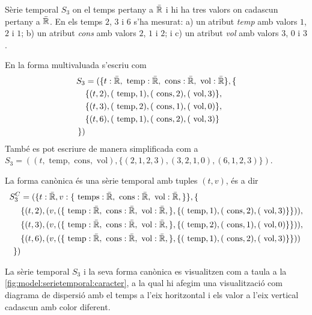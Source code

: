 \begin{example}
  Sèrie temporal $S_3$ on el temps pertany a $\bar{\mathbb{R}{}}$ i hi ha tres
  valors on cadascun pertany a $\bar{\mathbb{R}{}}$. En els temps $2$, $3$ i
  $6$ s'ha mesurat: a) un atribut \emph{temp} amb valors $1$, $2$ i
  $1$; b) un atribut \emph{cons} amb valors $2$, $1$ i $2$; i c) un
  atribut \emph{vol} amb valors $3$, $0$ i $3$.



En la forma multivaluada s'escriu com
\begin{align*}
  S_3  &= ( \{t: \bar{\mathbb{R}{}}, \text{ temp}: \bar{\mathbb{R}{}}, \text{
  cons}: \bar{\mathbb{R}{}},\text{ vol}: \bar{\mathbb{R}{}} \}, \{ \\
  & \{(t,2),(\text{ temp},1) ,( \text{ cons},2),(\text{ vol},3) \}, \\
  & \{(t,3),(\text{ temp},2) ,( \text{ cons},1),(\text{ vol},0) \}, \\
  & \{(t,6),(\text{ temp},1) , (\text{ cons},2),(\text{ vol},3) \} \\
\})
\end{align*}
També es pot escriure de manera simplificada com a $S_{3} = (
(t,\text{ temp},\text{ cons},\text{ vol}),\{ (2,1,2,3), (3,2,1,0),
(6,1,2,3) \})$.

La forma canònica és una sèrie temporal amb tuples $(t,v)$, és a dir
\begin{align*}
  S^C_{3} &= ( \{t: \bar{\mathbb{R}{}}, v: \{ \text{ temps}:
  \bar{\mathbb{R}{}}, \text{ cons}: \bar{\mathbb{R}{}},\text{ vol}:
  \bar{\mathbb{R}{}},\} \}, \{ \\
  & \{(t,2), (v, ( \{ \text{ temp}: \bar{\mathbb{R}{}}, \text{ cons}:
  \bar{\mathbb{R}{}},\text{ vol}: \bar{\mathbb{R}{}},\}, \{ (\text{ temp},1)
  ,  (\text{ cons},2),(\text{ vol},3) \}\} )), \\
 & \{(t,3), (v, ( \{ \text{ temp}: \bar{\mathbb{R}{}}, \text{ cons}:
  \bar{\mathbb{R}{}},\text{ vol}: \bar{\mathbb{R}{}},\}, \{ (\text{ temp},2)
  ,  (\text{ cons},1),(\text{ vol},0) \}\} )), \\
 & \{(t,6), (v, ( \{ \text{ temp}: \bar{\mathbb{R}{}}, \text{ cons}:
  \bar{\mathbb{R}{}},\text{ vol}: \bar{\mathbb{R}{}},\}, \{ (\text{ temp},1)
  ,  (\text{ cons},2),(\text{ vol},3) \}\} )) \\
  \} )
\end{align*}


La sèrie temporal $S_3$ i la seva forma canònica es visualitzen com a
taula a la \autoref{fig:model:serietemporal:caracter}, a la qual hi
afegim una visualització com diagrama de dispersió amb el temps a
l'eix horitzontal i els valor a l'eix vertical cadascun amb color
diferent.



\end{example}
